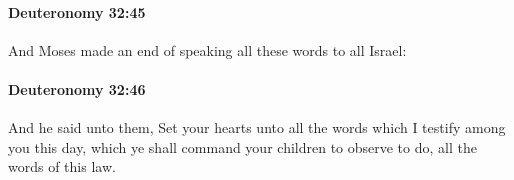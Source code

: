 		\paragraph{Deuteronomy 32:45} %
			\label{DEUTERONOMY-32-45}

			And Moses made an end of speaking all these words to all Israel:


		\paragraph{Deuteronomy 32:46} %
			\label{DEUTERONOMY-32-46}

			And he said unto them, Set your hearts unto all the words which I testify among you this day, which ye shall command your children to observe to do, all the words of this law.


